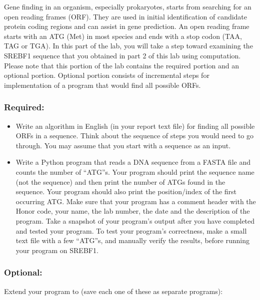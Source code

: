 Gene finding in an organism, especially prokaryotes, starts from searching for an open reading frames (ORF). They are used in initial identification of candidate protein coding regions and can assist in gene prediction. An open reading frame starts with an ATG (Met) in most species and ends with a stop codon (TAA, TAG or TGA). In this part of the lab, you will take a step toward examining the SREBF1 sequence that you obtained in part 2 of this lab using computation. Please note that this portion of the lab contains the required portion and an optional portion. Optional portion consists of incremental steps for implementation of a program that would find all possible ORFs. 

\subsubsection*{Required:}
\color{red}
\begin{itemize}
	\item Write an algorithm in English (in your report text file) for finding all possible ORFs in a sequence. Think about the sequence of steps you would need to go through. You may assume that you start with a sequence as an input.
	\item Write a Python program that reads a DNA sequence from a FASTA file and counts the number of ``ATG''s. Your program should print the sequence name (not the sequence) and then print the number of ATGs found in the sequence. Your program should also print the position/index of the first occurring ATG. Make sure that your program has a comment header with the Honor code, your name, the lab number, the date and the description of the program. Take a snapshot of your program's output after you have completed and tested your program. To test your program's correctness, make a small text file with a few ``ATG''s, and manually verify the results, before running your program on SREBF1.
\end{itemize}
\color{black}

\subsubsection*{Optional:}
Extend your program to (save each one of these as separate programs):

